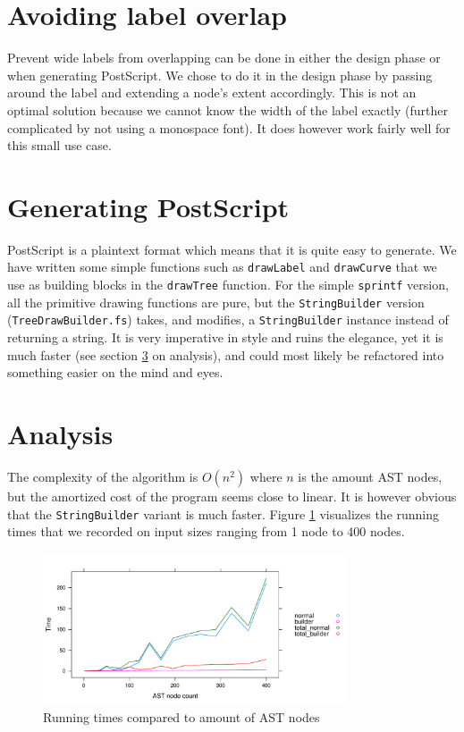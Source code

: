 \documentclass{article}
\begin{document}
\section{Avoiding label overlap}
Prevent wide labels from overlapping can be done in either the design phase or when generating PostScript. We chose to do it in the design phase by passing around the label and extending a node's extent accordingly. This is not an optimal solution because we cannot know the width of the label exactly (further complicated by not using a monospace font). It does however work fairly well for this small use case.


\section{Generating PostScript}
PostScript is a plaintext format which means that it is quite easy to generate. We have written some simple functions such as \texttt{drawLabel} and \texttt{drawCurve} that we use as building blocks in the \texttt{drawTree} function. For the simple \texttt{sprintf} version, all the primitive drawing functions are pure, but the \texttt{StringBuilder} version (\texttt{TreeDrawBuilder.fs}) takes, and modifies, a \texttt{StringBuilder} instance instead of returning a string. It is very imperative in style and ruins the elegance, yet it is much faster (see section \ref{sec:analysis} on analysis), and could most likely be refactored into something easier on the mind and eyes.


\section{Analysis}
\label{sec:analysis}
The complexity of the algorithm is $O(n^2)$ where $n$ is the amount AST nodes, but the amortized cost of the program seems close to linear. It is however obvious that the \texttt{StringBuilder} variant is much faster. Figure \ref{fig:plot} visualizes the running times that we recorded on input sizes ranging from 1 node to 400 nodes.

\begin{figure}[H]
  \centering
  \includegraphics[width=0.8\textwidth]{../times.pdf}
  \caption{Running times compared to amount of AST nodes}
  \label{fig:plot}
\end{figure}
\end{document}
